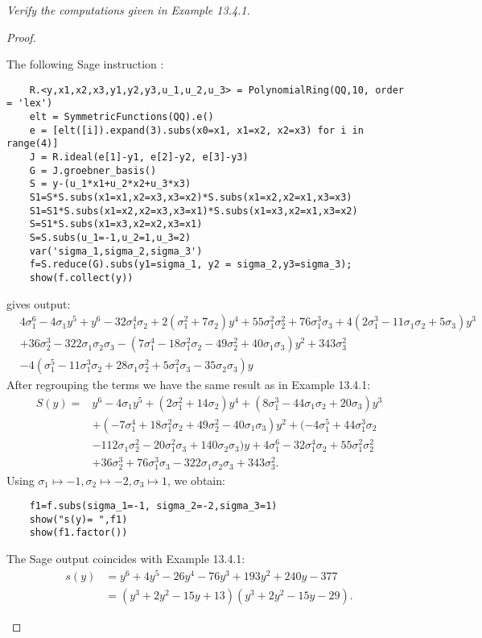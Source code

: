 \documentclass[11pt,a4paper]{article}
\newcommand{\be} {\begin{enumerate}}
\newcommand{\ee} {\end{enumerate}}
\begin{document}
{\it Verify the computations given in Example 13.4.1.
\begin{proof}
\be
The following Sage instruction :
\begin{verbatim}
    R.<y,x1,x2,x3,y1,y2,y3,u_1,u_2,u_3> = PolynomialRing(QQ,10, order = 'lex')
    elt = SymmetricFunctions(QQ).e()
    e = [elt([i]).expand(3).subs(x0=x1, x1=x2, x2=x3) for i in range(4)]
    J = R.ideal(e[1]-y1, e[2]-y2, e[3]-y3)
    G = J.groebner_basis()
    S = y-(u_1*x1+u_2*x2+u_3*x3)
    S1=S*S.subs(x1=x1,x2=x3,x3=x2)*S.subs(x1=x2,x2=x1,x3=x3)
    S1=S1*S.subs(x1=x2,x2=x3,x3=x1)*S.subs(x1=x3,x2=x1,x3=x2)
    S=S1*S.subs(x1=x3,x2=x2,x3=x1)
    S=S.subs(u_1=-1,u_2=1,u_3=2)
    var('sigma_1,sigma_2,sigma_3')
    f=S.reduce(G).subs(y1=sigma_1, y2 = sigma_2,y3=sigma_3);
    show(f.collect(y))
\end{verbatim}
gives output:
\begin{align*}
& 4\sigma_{1}^{6} - 4\sigma_{1}y^{5} + y^{6} - 32 \sigma_{1}^{4}\sigma_{2} + 2(\sigma_{1}^{2} + 7 \sigma_{2}) y^{4} + 55 \sigma_{1}^{2} \sigma_{2}^{2} + 76 \sigma_{1}^{3} \sigma_{3} + 4(2 \sigma_{1}^{3} - 11\sigma_{1} \sigma_{2} + 5\sigma_{3}) y^{3} \\
& + 36\sigma_{2}^{3} - 322  \sigma_{1} \sigma_{2} \sigma_{3} - (7\sigma_{1}^{4} - 18 \sigma_{1}^{2} \sigma_{2} - 49 \sigma_{2}^{2} + 40\sigma_{1} \sigma_{3}) y^{2} + 343 \sigma_{3}^{2} \\
& - 4 (\sigma_{1}^{5} - 11\sigma_{1}^{3} \sigma_{2} + 28\sigma_{1} \sigma_{2}^{2} + 5 \sigma_{1}^{2} \sigma_{3} - 35 \sigma_{2} \sigma_{3}) y
\end{align*}
After regrouping the terms we have the same result as in Example 13.4.1:
\begin{align*}
S(y)= & y^{6} - 4\sigma_{1}y^{5} + (2\sigma_{1}^{2} + 14\sigma_{2}) y^{4} + (8 \sigma_{1}^{3} - 44\sigma_{1} \sigma_{2} + 20\sigma_{3}) y^{3} \\
& + (-7\sigma_{1}^{4} + 18 \sigma_{1}^{2} \sigma_{2} + 49 \sigma_{2}^{2} - 40\sigma_{1} \sigma_{3}) y^{2} + (-4 \sigma_{1}^{5} + 44\sigma_{1}^{3} \sigma_{2} \\ & - 112\sigma_{1} \sigma_{2}^{2} - 20\sigma_{1}^{2} \sigma_{3} + 140\sigma_{2} \sigma_{3}) y+4\sigma_{1}^{6}  - 32 \sigma_{1}^{4}\sigma_{2} + 55 \sigma_{1}^{2} \sigma_{2}^{2} \\
& + 36\sigma_{2}^{3} + 76 \sigma_{1}^{3} \sigma_{3} - 322  \sigma_{1} \sigma_{2} \sigma_{3} + 343 \sigma_{3}^{2}. 
\end{align*}
Using $\sigma_1 \mapsto -1,\sigma_2 \mapsto -2,\sigma_3 \mapsto 1$, we obtain:
\begin{verbatim}
    f1=f.subs(sigma_1=-1, sigma_2=-2,sigma_3=1)
    show("s(y)= ",f1)
    show(f1.factor())
\end{verbatim}
The Sage output coincides with Example 13.4.1:
\begin{align*}
s(y)& = y^{6} + 4y^{5} - 26y^{4} - 76y^{3} + 193y^{2} + 240y - 377 \\
& = (y^{3} + 2y^{2} - 15y + 13)(y^{3} + 2y^{2} - 15y - 29). 
\end{align*}
\ee\end{proof}
}
\end{document}
